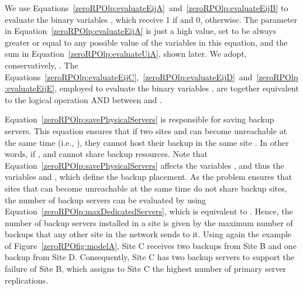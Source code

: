\documentclass[preprint]{elsarticle}
\begin{document}
We use Equations~\ref{zeroRPOlp:evaluateEijA}~and~\ref{zeroRPOlp:evaluateEijB} to evaluate the binary variables , which receive 1 if  and 0, otherwise. The parameter  in Equation~\ref{zeroRPOlp:evaluateEijA} is just a high value, set to be always greater or equal to any possible value of the variables 
 in this equation, and the sum  in Equation~\ref{zeroRPOlp:evaluateUiA}, shown later. We adopt, conservatively, .
The Equations~\ref{zeroRPOlp:evaluateEijC},~\ref{zeroRPOlp:evaluateEijD}~and~\ref{zeroRPOlp:evaluateEijE}, employed to evaluate the binary variables , are together equivalent to the logical operation AND between  and .

Equation~\ref{zeroRPOlp:savePhysicalServers} is responsible for saving backup servers. This equation ensures that if two sites  and  can become unreachable at the same time (i.e., ), they cannot host their backup in the same site . In other words, if ,  and  cannot share backup resources. Note that Equation~\ref{zeroRPOlp:savePhysicalServers} affects the variables , and thus the variables  and , which define the backup placement.
As the problem ensures that sites that can become unreachable at the same time do not share backup sites, the number of backup servers can be evaluated by using 
Equation~\ref{zeroRPOlp:maxDedicatedServers}, which is equivalent to . Hence, the number of backup servers installed in a site  is given by the maximum number of backups that any other site in the network sends to it.
Using again the example of Figure~\ref{zeroRPOfig:modelA}, Site C receives two backups from Site B and one backup from Site D. Consequently, Site C has two backup servers to support the failure of Site B, which assigns to Site C the highest number of primary server replications.
\end{document}
